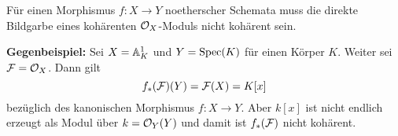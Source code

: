 \begin{bem}
\label{bem:9.11}
	Für einen Morphismus $f\colon X \to Y$ noetherscher Schemata muss die direkte Bildgarbe eines kohärenten $\mathcal{O}_X$-Moduls nicht kohärent sein.

	\textbf{Gegenbeispiel:} Sei $X=\mathbb {A}^1_K$ und $Y =\operatorname{Spec}(K)$ für einen Körper $K$. Weiter sei $\mathcal{F} = \mathcal{O}_X$. Dann gilt
	\[
		f_*(\mathcal{F})(Y) = \mathcal{F}(X) = K[x]
	\]
	bezüglich des kanonischen Morphismus $f\colon X \to Y$. Aber $k[x]$ ist nicht endlich erzeugt als Modul über $k=\mathcal{O}_Y(Y)$ und damit ist $f_*(\mathcal{F})$ nicht kohärent.
\end{bem}

